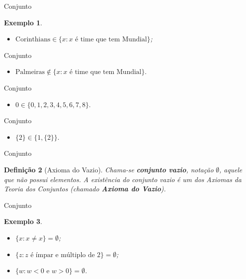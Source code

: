 \documentclass[10pt]{beamer}
\renewcommand{\indent}{\hspace*{2em}}
\theoremstyle{plain}
\newtheorem{defn}{Definição}[section]
\newtheorem{ex}[defn]{Exemplo}
\begin{document}
\begin{frame}{Conjunto}
\begin{ex}
 \begin{itemize}
     \item $\mbox{Corinthians}\in\{x:x\mbox{ é time que tem Mundial}\}$;
 \end{itemize}
\end{ex}
\end{frame}

\begin{frame}{Conjunto}
\begin{block}{}
 \begin{itemize}
     \item $\mbox{Palmeiras}\notin\{x:x\mbox{ é time que tem Mundial}\}$.
 \end{itemize}
\end{block}
\end{frame}

\begin{frame}{Conjunto}
\begin{block}{}
 \begin{itemize}
     \item $0\in\{0,1,2,3,4,5,6,7,8\}$.
 \end{itemize}
\end{block}
\end{frame}

\begin{frame}{Conjunto}
\begin{block}{}
 \begin{itemize}
     \item $\{2\}\in\{1,\{2\}\}$.
 \end{itemize}
\end{block}
\end{frame}

\begin{frame}{Conjunto}
\begin{defn}[Axioma do Vazio]
\vfill\indent Chama-se \textbf{conjunto vazio}, notação $\emptyset$, aquele que não possui elementos. A existência do conjunto vazio é um dos Axiomas da Teoria dos Conjuntos (chamado \textbf{Axioma do Vazio}).
\end{defn}
\end{frame}

\begin{frame}{Conjunto}
\begin{ex}
 \begin{itemize}
     \item $\{x:x\ne x\}=\emptyset$;
     \item $\{z:z\mbox{ é ímpar e múltiplo de }2\}=\emptyset$;
     \item $\{w:w<0\mbox{ e }w>0\}=\emptyset$.
 \end{itemize}
\end{ex}
\end{frame}
\end{document}
